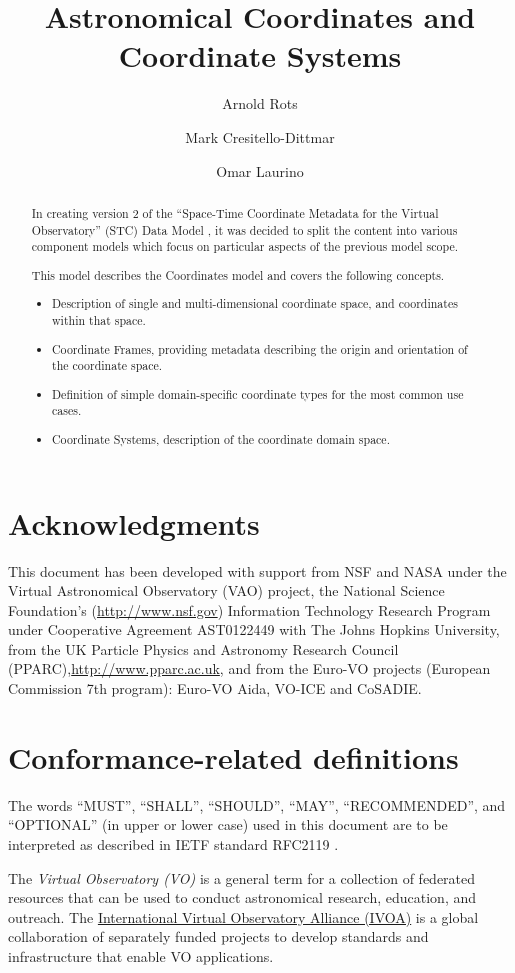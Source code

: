 \documentclass[11pt,a4paper]{ivoa}
\title{Astronomical Coordinates and Coordinate Systems}
\author{Arnold Rots}
\author{Mark Cresitello-Dittmar}
\author{Omar Laurino}
\begin{document}
\begin{abstract}
  In creating version 2 of the ``Space-Time Coordinate Metadata for the Virtual Observatory'' (STC) Data Model \citep{2007ivoa.spec.1030R}, it was decided to split the content into various component models which focus on particular aspects of the previous model scope.  
  
  This model describes the Coordinates model and covers the following concepts.
  \begin{itemize}
  \item Description of single and multi-dimensional coordinate space, and coordinates within that space.
  \item Coordinate Frames, providing metadata describing the origin and orientation of the coordinate space.
  \item Definition of simple domain-specific coordinate types for the most common use cases.
  \item Coordinate Systems, description of the coordinate domain space.
  \end{itemize}
\end{abstract}


\section*{Acknowledgments}
This document has been developed with support from NSF and NASA under the Virtual Astronomical Observatory (VAO) project, the National Science Foundation’s (\url{http://www.nsf.gov}) Information Technology Research Program under Cooperative Agreement AST0122449 with The Johns Hopkins University, from the UK Particle Physics and Astronomy Research Council (PPARC),\url{http://www.pparc.ac.uk}, and from the Euro-VO projects (European Commission 7th program): Euro-VO Aida, VO-ICE and CoSADIE.

\section*{Conformance-related definitions}

The words ``MUST'', ``SHALL'', ``SHOULD'', ``MAY'', ``RECOMMENDED'', and
``OPTIONAL'' (in upper or lower case) used in this document are to be
interpreted as described in IETF standard RFC2119 \citep{std:RFC2119}.

The \emph{Virtual Observatory (VO)} is a
general term for a collection of federated resources that can be used
to conduct astronomical research, education, and outreach.
The \href{http://www.ivoa.net}{International
Virtual Observatory Alliance (IVOA)} is a global
collaboration of separately funded projects to develop standards and
infrastructure that enable VO applications.
\end{document}
